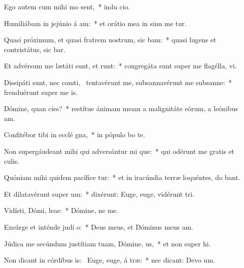 \item Ego autem cum mihi mo sent,~* indu cio.
\item Humiliábam in jejúnio á am:~* et orátio mea in sinu me tur.
\item Quasi próximum, et quasi fratrem nostrum, sic bam:~* quasi lugens et contristátus, sic bar.
\item Et advérsum me lætáti sunt, et runt:~* congregáta sunt super me flagélla,  vi.
\item Dissipáti sunt, nec comti,~\pscross{} tentavérunt me, subsannavérunt me subsanne:~* frenduérunt super me  is.
\item Dómine, quan cies?~* restítue ánimam meam a malignitáte eórum, a leónibus  am.
\item Confitébor tibi in ecclé gna,~* in pópulo  bo te.
\item Non supergáudeant mihi qui adversántur mi que:~* qui odérunt me gratis et  culis.
\item Quóniam mihi quidem pacífice tur:~* et in iracúndia terræ loquéntes, do bant.
\item Et dilatavérunt super   um:~* dixérunt: Euge, euge, vidérunt  tri.
\item Vidísti, Dómi,  leas:~* Dómine, ne   me.
\item Exsúrge et inténde judí o:~* Deus meus, et Dóminus meus   am.
\item Júdica me secúndum justítiam tuam, Dómine,  us,~* et non super hi.
\item Non dicant in córdibus is:~\pscross{} Euge, euge, á træ:~* nec dicant: Devo um.

